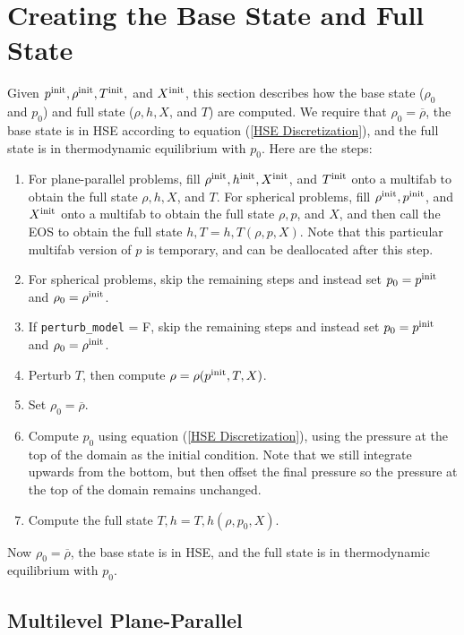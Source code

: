 \documentclass[11pt]{article}
\def\init  {\rm init}
\begin{document}
\section{Creating the Base State and Full State}\label{Sec:Creating the Base State and Full State}
Given $p^{\init}, \rho^{\init}, T^{\init},$ and $X^{\init}$, this section describes how the base state ($\rho_0$ and $p_0$) and full state ($\rho, h, X$, and $T$) are computed.  We require that $\rho_0 = \overline\rho$, the base state is in HSE according to equation (\ref{HSE Discretization}), and the full state is in thermodynamic equilibrium with $p_0$.  Here are the steps:
\begin{enumerate}
\item For plane-parallel problems, fill $\rho^{\init}, h^{\init}, X^{\init}$, and $T^{\init}$ onto a multifab to obtain the full state $\rho, h, X$, and $T$.  For spherical problems, fill $\rho^{\init}, p^{\init}$, and $X^{\init}$ onto a multifab to obtain the full state $\rho, p$, and $X$, and then call the EOS to obtain the full state $h,T = h,T(\rho,p,X)$.  Note that this particular multifab version of $p$ is temporary, and can be deallocated after this step.
\item For spherical problems, skip the remaining steps and instead set $p_0 = p^{\init}$ and $\rho_0 = \rho^{\init}$.
\item If {\tt perturb\_model} = F, skip the remaining steps and instead set $p_0 = p^{\init}$ and $\rho_0 = \rho^{\init}$.
\item Perturb $T$, then compute $\rho = \rho(p^{\init},T,X)$.
\item Set $\rho_0 = \overline\rho$.
\item Compute $p_0$ using equation (\ref{HSE Discretization}), using the pressure at the top of the domain as the initial condition.  Note that we still integrate upwards from the bottom, but then offset the final pressure so the pressure at the top of the domain remains unchanged.
\item Compute the full state $T,h = T,h(\rho,p_0,X)$.
\end{enumerate}
Now $\rho_0 = \overline\rho$, the base state is in HSE, and the full state is in thermodynamic equilibrium with $p_0$.
\subsection{Multilevel Plane-Parallel}
\end{document}

